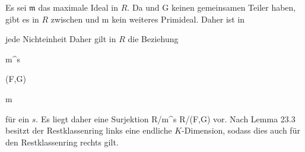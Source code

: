 {


\faktsituation {}



\faktzusatz {}

\faktzusatz {}


}

{


Es sei ${\mathfrak m}$ das maximale Ideal in $R$. Da   {  und   }  {  G   }{ } keinen gemeinsamen Teiler haben, gibt es in $R$ zwischen   {  und  }  {  {\mathfrak m}   }{ } kein weiteres Primideal. Daher ist in

 jede Nichteinheit
Daher gilt in $R$ die Beziehung


\mavergleichskette

{\vergleichskette

{ {\mathfrak m}^s
}

{ \subseteq }{ (F,G)
}

{ \subseteq }{ {\mathfrak m}
}

{    }{
}

{   }{
}

}
{}{}{}
für ein $s$. Es liegt daher eine Surjektion
\maabbdisp {} {R/{\mathfrak m}^s} {R/(F,G)
} {}
vor. Nach
Lemma 23.3
besitzt der Restklassenring links eine endliche $K$-Dimension, sodass dies auch für den Restklassenring rechts gilt.


}


